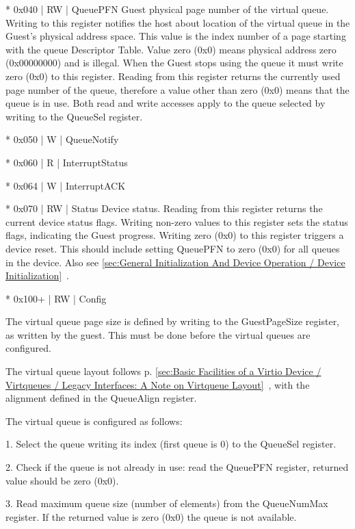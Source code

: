 * 0x040 | RW | QueuePFN
  Guest physical page number of the virtual queue.
  Writing to this register notifies the host about location of the
  virtual queue in the Guest's physical address space. This value
  is the index number of a page starting with the queue
  Descriptor Table. Value zero (0x0) means physical address zero
  (0x00000000) and is illegal. When the Guest stops using the
  queue it must write zero (0x0) to this register.
  Reading from this register returns the currently used page
  number of the queue, therefore a value other than zero (0x0)
  means that the queue is in use.
  Both read and write accesses apply to the queue selected by
  writing to the QueueSel register.

* 0x050 | W | QueueNotify

* 0x060 | R | InterruptStatus

* 0x064 | W | InterruptACK

* 0x070 | RW | Status
  Device status.
  Reading from this register returns the current device status
  flags.
  Writing non-zero values to this register sets the status flags,
  indicating the Guest progress. Writing zero (0x0) to this
  register triggers a device reset. This should include
  setting QueuePFN to zero (0x0) for all queues in the device.
  Also see \ref{sec:General Initialization And Device Operation / Device Initialization}~.

* 0x100+ | RW | Config

The virtual queue page size is defined by writing to the GuestPageSize
register, as written by the guest. This must be done before the
virtual queues are configured.

The virtual queue layout follows
p. \ref{sec:Basic Facilities of a Virtio Device / Virtqueues / Legacy Interfaces: A Note on Virtqueue Layout}~,
with the alignment defined in the QueueAlign register.

The virtual queue is configured as follows:

1. Select the queue writing its index (first queue is 0) to the
   QueueSel register.

2. Check if the queue is not already in use: read the QueuePFN
   register, returned value should be zero (0x0).

3. Read maximum queue size (number of elements) from the
   QueueNumMax register. If the returned value is zero (0x0) the
   queue is not available.

